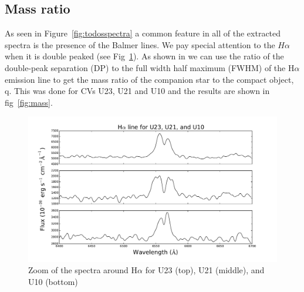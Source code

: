 \subsection{Mass ratio}

As seen in Figure~\ref{fig:todosspectra} a common feature in all of the extracted spectra is the presence of the Balmer lines. We pay special attention to the $H\alpha$ when it is double peaked (see Fig~\ref{fig:halphatodos}). As shown in \cite{casares_massration_20016} we can use the ratio of the double-peak separation (DP) to the full width half maximum (FWHM) of the H$\alpha$ emission line to get the mass ratio of the companion star to the compact object, q. This was done for CVs U23, U21 and U10 and the results are shown in fig~\ref{fig:mass}.

\begin{figure}[]
        \centering
        \includegraphics[scale=.5]{assets/images/todos.pdf}
\caption{Zoom of the spectra around H$\alpha$ for U23 (top), U21 (middle), and U10 (bottom)}
\label{fig:halphatodos}
\end{figure}

